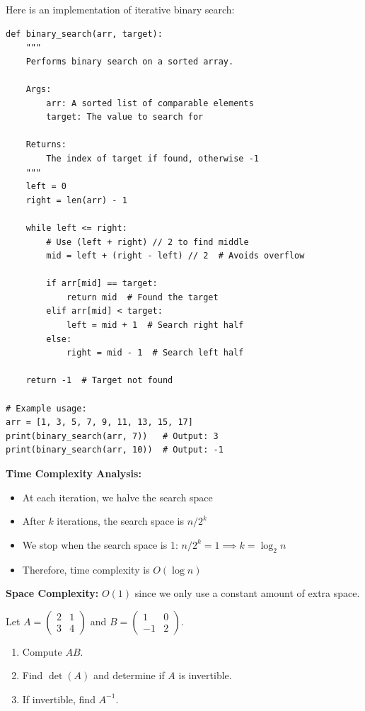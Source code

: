 \begin{solution}
Here is an implementation of iterative binary search:

\begin{lstlisting}[style=python, caption={Binary search implementation}]
def binary_search(arr, target):
    """
    Performs binary search on a sorted array.

    Args:
        arr: A sorted list of comparable elements
        target: The value to search for

    Returns:
        The index of target if found, otherwise -1
    """
    left = 0
    right = len(arr) - 1

    while left <= right:
        # Use (left + right) // 2 to find middle
        mid = left + (right - left) // 2  # Avoids overflow

        if arr[mid] == target:
            return mid  # Found the target
        elif arr[mid] < target:
            left = mid + 1  # Search right half
        else:
            right = mid - 1  # Search left half

    return -1  # Target not found

# Example usage:
arr = [1, 3, 5, 7, 9, 11, 13, 15, 17]
print(binary_search(arr, 7))   # Output: 3
print(binary_search(arr, 10))  # Output: -1
\end{lstlisting}

\textbf{Time Complexity Analysis:}
\begin{itemize}
    \item At each iteration, we halve the search space
    \item After $k$ iterations, the search space is $n / 2^k$
    \item We stop when the search space is 1: $n / 2^k = 1 \implies k = \log_2 n$
    \item Therefore, time complexity is $O(\log n)$
\end{itemize}

\textbf{Space Complexity:} $O(1)$ since we only use a constant amount of extra space.
\end{solution}

\begin{problem}
Let $A = \begin{pmatrix} 2 & 1 \\ 3 & 4 \end{pmatrix}$ and $B = \begin{pmatrix} 1 & 0 \\ -1 & 2 \end{pmatrix}$.

\begin{enumerate}[label=(\alph*)]
    \item Compute $AB$.
    \item Find $\det(A)$ and determine if $A$ is invertible.
    \item If invertible, find $A^{-1}$.
\end{enumerate}
\end{problem}

